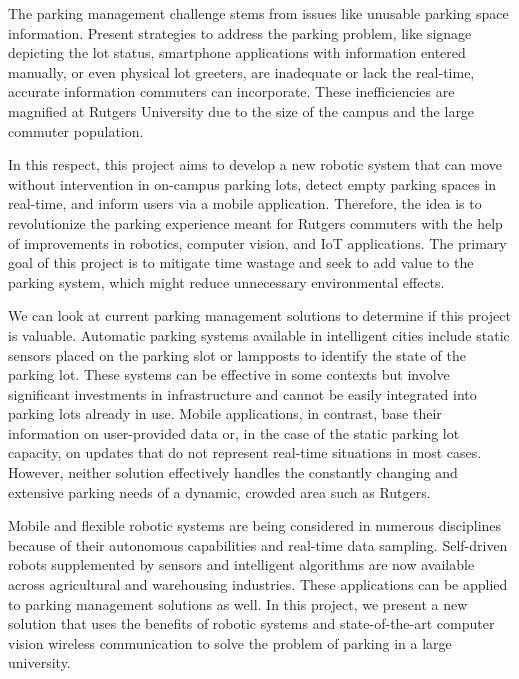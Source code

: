 \documentclass{article}
\begin{document}
\begin{enumerate}[leftmargin=1.5cm]
    The parking management challenge stems from issues like unusable parking space information. 
    Present strategies to address the parking problem, 
    like signage depicting the lot status, 
    smartphone applications with information entered manually, 
    or even physical lot greeters, 
    are inadequate or lack the real-time, 
    accurate information commuters can incorporate. 
    These inefficiencies are magnified at Rutgers University due to the size of the campus and the large commuter population.

    In this respect, 
    this project aims to develop a new robotic system that can move without intervention in on-campus parking lots, 
    detect empty parking spaces in real-time, 
    and inform users via a mobile application. 
    Therefore, 
    the idea is to revolutionize the parking experience meant for Rutgers commuters with the help of improvements in robotics, 
    computer vision, 
    and IoT applications. 
    The primary goal of this project is to mitigate time wastage and seek to add value to the parking system, 
    which might reduce unnecessary environmental effects.

    We can look at current parking management solutions to determine if this project is valuable. 
    Automatic parking systems available in intelligent cities include static sensors placed on the parking slot or lampposts to identify the state of the parking lot. 
    These systems can be effective in some contexts but involve significant investments in infrastructure and cannot be easily integrated into parking lots already in use. 
    Mobile applications, 
    in contrast, 
    base their information on user-provided data or, 
    in the case of the static parking lot capacity, 
    on updates that do not represent real-time situations in most cases. 
    However, 
    neither solution effectively handles the constantly changing and extensive parking needs of a dynamic, 
    crowded area such as Rutgers.

    Mobile and flexible robotic systems are being considered in numerous disciplines because of their autonomous capabilities and real-time data sampling. 
    Self-driven robots supplemented by sensors and intelligent algorithms are now available across agricultural and warehousing industries. 
    These applications can be applied to parking management solutions as well. 
    In this project, 
    we present a new solution that uses the benefits of robotic systems and state-of-the-art computer vision wireless communication to solve the problem of parking in a large university.


\end{enumerate}
\end{document}
